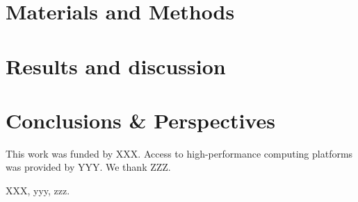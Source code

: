 \documentclass[journal=jacsat,manuscript=article]{achemso}
\begin{document}
\section{Materials and Methods}




\section{Results and discussion}


\section{Conclusions \& Perspectives}



\begin{acknowledgement}
This work was funded by XXX. Access to high-performance computing platforms was provided by YYY. We thank ZZZ.
\end{acknowledgement}

\begin{suppinfo}
XXX, yyy, zzz.
\end{suppinfo}


\end{document}
